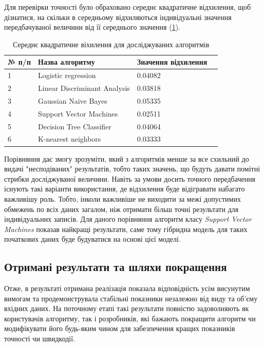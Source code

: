 Для перевірки точності було обраховано середнє квадратичне відхилення, щоб дізнатися, на скільки в середньому відхиляються індивідуальні значення передбачуваної величини від її середнього значення (\ref{tab:standard_deviation}).

\begin{table}[h!]
	\begin{tabularx}{\textwidth}{|X|X|X|X|}
    \hline
    № п/п & Назва алгоритму & Значення відхилення \\ \hline
    1 & Logistic regression & 0.04082 \\ \hline
    2 & Linear Discriminant Analysis & 0.03818 \\ \hline
    3 & Gaussian Naive Bayes & 0.05335 \\ \hline
    4 & Support Vector Machines & 0.02511 \\ \hline
    5 & Decision Tree Classifier & 0.04064 \\ \hline
    6 & K-nearest neighbors & 0.03333 \\ \hline
    \hline
    \end{tabularx}
\caption{Середнє квадратичне віхилення для досліджуваних алгоритмів} \label{tab:standard_deviation}
\end{table}

Порівняння дає змогу зрозуміти, який з алгоритмів менше за все схильний до видачі "несподіваних" результатів, тобто таких значень, що будуть давати помітні стрибки досліджуваної величини. Навіть за умови досить точного передбачення існують такі варіанти використання, де відхилення буде відігравати набагато важливішу роль. Тобто, інколи важливіше не виходити за межі допустимих обмежень по всіх даних загалом, ніж отримати більш точні результати для індивідуальних записів. Для даного порівняння алгоритм класу \textit{Support Vector Machines} показав найкращі результати, саме тому гібридна модель для таких початкових даних буде будуватися на основі цієї моделі.

\subsection{Отримані результати та шляхи покращення}
Отже, в результаті отримана реалізація показала відповідність усім висунутим вимогам та продемонструвала стабільні показники незалежно від виду та об'єму вхідних даних. На поточному етапі такі результати повністю задоволняють як користувачів алгоритму, так і розробників, які бажають покращити алгоритм чи модифікувати його будь-яким чином для забезпечення кращих показників точності чи швидкодії.

